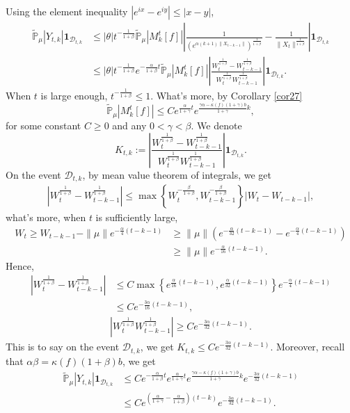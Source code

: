 \documentclass[12pt,oneside,english]{amsart}
\theoremstyle{plain}
\theoremstyle{definition}
\numberwithin{equation}{section}
\begin{document}
    Using the element inequality $|e^{ix}-e^{iy}|\leq|x-y|$,
    \begin{align*}
        \mathbb{\tilde{P}}_{\mu}|Y_{t,k}|\mathbf{1}_{\mathcal{D}_{t,k}}&\leq|\theta|t^{-\frac{1}{1+\beta}}\mathbb{\tilde{P}}_{\mu}|M_k^t[f]|\left|\frac{1}{\left(e^{\alpha(k+1)\|X_{t-k-1}\|}\right)^{\frac{1}{1+\beta}}}-\frac{1}{\|X_t\|^{\frac{1}{1+\beta}}}\right|\mathbf{1}_{\mathcal{D}_{t,k}}\\
        &\leq|\theta|t^{-\frac{1}{1+\beta}}e^{-\frac{\alpha}{1+\beta}t}\mathbb{\tilde{P}}_{\mu}|M_k^t[f]|\left|\frac{W_t^{\frac{1}{1+\beta}}-W_{t-k-1}^{\frac{1}{1+\beta}}}{W_t^{\frac{1}{1+\beta}}W_{t-k-1}^{\frac{1}{1+\beta}}}\right|\mathbf{1}_{\mathcal{D}_{t,k}}.
    \end{align*}
    When $t$ is large enough, $t^{-\frac{1}{1+\beta}}\leq 1$. What's more, by Corollary \ref{cor27}
    $$\mathbb{\tilde{P}}_{\mu}|M_k^t[f]|\leq C e^{\frac{\alpha}{1+\gamma}t}e^{\frac{\gamma \alpha-\kappa(f)(1+\gamma)b}{1+\gamma}k},$$
for some constant $C \geq 0$ and any $0<\gamma<\beta$.
We denote
$$K_{t,k}:=\left|\frac{W_t^{\frac{1}{1+\beta}}-W_{t-k-1}^{\frac{1}{1+\beta}}}{W_t^{\frac{1}{1+\beta}}W_{t-k-1}^{\frac{1}{1+\beta}}}\right|\mathbf{1}_{\mathcal{D}_{t,k}}.$$
 On the event $\mathcal{D}_{t,k}$, by mean value theorem of integrals, we get
 \begin{align*}
     \left|W_t^{\frac{1}{1+\beta}}-W_{t-k-1}^{\frac{1}{1+\beta}}\right|\leq \max \left\{W_t^{-\frac{\beta}{1+\beta}},W_{t-k-1}^{-\frac{\beta}{1+\beta}}\right\}\left|W_t-W_{t-k-1}\right|,
 \end{align*}
 what's more, when $t$ is sufficiently large,
 \begin{align*}
     W_t\geq W_{t-k-1}-\|\mu\| e^{-\frac{\alpha}{4}(t-k-1)}&\geq\|\mu\|\left(e^{-\frac{\alpha}{32}(t-k-1)}-e^{-\frac{\alpha}{4}(t-k-1)}\right)\\
     &\geq \|\mu\| e^{-\frac{\alpha}{16}(t-k-1)}.
 \end{align*}
Hence,
\begin{align*}
    \left|W_t^{\frac{1}{1+\beta}}-W_{t-k-1}^{\frac{1}{1+\beta}}\right|&\leq C \max\left\{e^{\frac{\alpha}{16}(t-k-1)}, e^{\frac{\alpha}{32}(t-k-1)}\right\}e^{-\frac{\alpha}{4}(t-k-1)}\\
    &\leq C e^{-\frac{3\alpha}{16}(t-k-1)},
\end{align*}
\begin{align*}
    \left|W_t^{\frac{1}{1+\beta}}W_{t-k-1}^{\frac{1}{1+\beta}}\right|\geq C e^{-\frac{3\alpha}{32}(t-k-1)}.
\end{align*}
This is to say on the event $\mathcal{D}_{t,k}$, we get $K_{t,k}\leq C e^{-\frac{3\alpha}{32}(t-k-1)}$. Moreover, recall that $\alpha\beta=\kappa(f)(1+\beta)b$, we get
\begin{align}
    \mathbb{\tilde{P}}_{\mu}|Y_{t,k}|\mathbf{1}_{\mathcal{D}_{t,k}}&\leq C e^{-\frac{\alpha}{1+\beta}t}e^{\frac{\alpha}{1+\gamma}t}e^{\frac{\gamma \alpha-\kappa(f)(1+\gamma)b}{1+\gamma}k}e^{-\frac{3\alpha}{32}(t-k-1)}\label{thm125}\\
    &\leq C e^{(\frac{\alpha}{1+\gamma}-\frac{\alpha}{1+\beta})(t-k)}e^{-\frac{3\alpha}{32}(t-k-1)}.\nonumber
\end{align}
\end{document}
